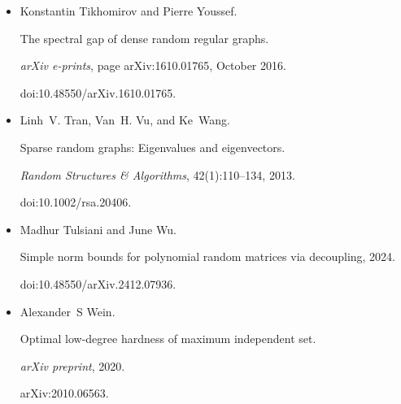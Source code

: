 \documentclass[10pt,a4paper]{article}
\begin{document}
\begin{itemize}
Tselil Schramm and Alexander S. Wein.


Computational barriers to estimation from low-degree polynomials.


\emph{The Annals of Statistics}, 50(3), June 2022.


doi:10.1214/22-aos2179.





\item[] 
[45]

Konstantin Tikhomirov and Pierre Youssef.


The spectral gap of dense random regular graphs.


\emph{arXiv e-prints}, page arXiv:1610.01765, October 2016.


doi:10.48550/arXiv.1610.01765.





\item[] 
[46]

Linh V. Tran, Van H. Vu, and Ke Wang.


Sparse random graphs: Eigenvalues and eigenvectors.


\emph{Random Structures \& Algorithms}, 42(1):110–134, 2013.


doi:10.1002/rsa.20406.





\item[] 
[47]

Madhur Tulsiani and June Wu.


Simple norm bounds for polynomial random matrices via decoupling,
2024.


doi:10.48550/arXiv.2412.07936.





\item[] 
[48]

Alexander S Wein.


Optimal low-degree hardness of maximum independent set.


\emph{arXiv preprint}, 2020.


arXiv:2010.06563.





\end{itemize}
\end{document}
